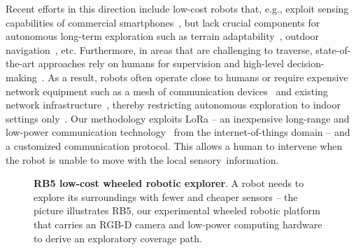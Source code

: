 \documentclass[letterpaper,10pt,conference,twoside]{IEEEtran}
\theoremstyle{definition}
\begin{document}
Recent efforts in this direction include low-cost robots that, e.g., exploit sensing capabilities of commercial smartphones~\cite{muller2021openbot,zhou2021smartphone}, but %
lack crucial components for autonomous long-term exploration such as %
terrain adaptability~\cite{muller2021openbot,srinivasa2019mushr}, %
outdoor navigation~\cite{zhou2021smartphone,faisal2021low}, etc. 
%
Furthermore, in areas that are %
challenging to traverse, %
state-of-the-art approaches rely on humans for supervision and high-level decision-making~\cite{tranzatto2022cerberus,roucek2020darpa,tabib2022autonomous}. 
As a result, robots often operate close to humans or require expensive network equipment such as a mesh of communication devices~\cite{kulkarni2022autonomous,ebadi2020lamp} and existing network infrastructure~\cite{khairuldanial2019mobile,%
voigtlander20175g}, thereby restricting autonomous exploration to indoor settings only~\cite{delgado2022oros,
cadena2016past,eldemiry2022autonomous,corah2019communication
}.
%
Our methodology exploits LoRa -- an inexpensive long-range and low-power communication technology~\cite{shanmuga2020survey} from the
internet-of-things domain 
-- and a customized communication protocol. 
This allows a human to intervene when %
the robot %
is unable to move with the local sensory~information. 

\begin{figure}
     
   \caption[RB5 low-cost wheeled robotic explorer]{
     \textbf{RB5 low-cost wheeled robotic explorer}. 
     A robot needs to explore its surroundings with fewer and cheaper sensors -- %
     the picture illustrates RB5, our experimental wheeled robotic platform that carries an RGB-D camera and low-power computing hardware to derive an exploratory coverage path. %
   }
   \vspace*{-.2cm}
   \label{fig:0}
 \end{figure}
\end{document}
